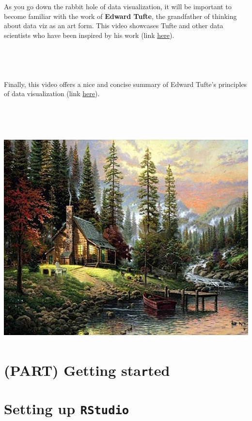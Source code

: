 \documentclass[
]{book}
\begin{document}
As you go down the rabbit hole of data visualization, it will be important to become familiar with the work of \textbf{Edward Tufte}, the grandfather of thinking about data viz as an art form. This video showcases Tufte and other data scientists who have been inspired by his work (link \href{https://www.youtube.com/watch?v=AdSZJzb-aX8}{here}).

~

~

Finally, this video offers a nice and concise summary of Edward Tufte's principles of data visualization (link \href{https://www.youtube.com/watch?v=r7YdcZkS_1k}{here}).

~

~\\
\hspace*{0.333em}

\includegraphics{img/vis-painting.jpeg}

\hypertarget{part-getting-started}{%
\chapter*{\texorpdfstring{(PART) Getting sta\texttt{r}ted}{(PART) Getting started}}\label{part-getting-started}}

\hypertarget{setting-up-rstudio}{%
\chapter{\texorpdfstring{Setting up \texttt{RStudio}}{Setting up RStudio}}\label{setting-up-rstudio}}
\end{document}
